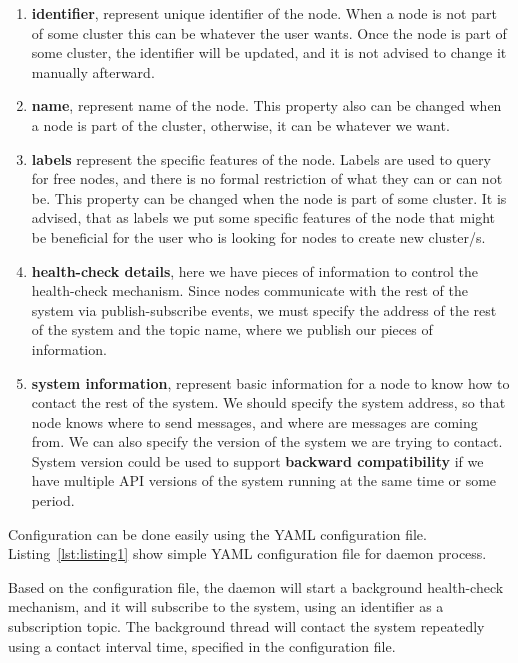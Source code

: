 \begin{enumerate}[start=1,label={(\bfseries \arabic*)}] \label{imp:features}
	\item \textbf{identifier}, represent unique identifier of the node. When a node is not part of some cluster this can be whatever the user wants. Once the node is part of some cluster, the identifier will be updated, and it is not advised to change it manually afterward.
	\item \textbf{name}, represent name of the node. This property also can be changed when a node is part of the cluster, otherwise, it can be whatever we want.
	\item \textbf{labels} represent the specific features of the node. Labels are used to query for free nodes, and there is no formal restriction of what they can or can not be. This property can be changed when the node is part of some cluster. It is advised, that as labels we put some specific features of the node that might be beneficial for the user who is looking for nodes to create new cluster/s.
	\item \textbf{health-check details}, here we have pieces of information to control the health-check mechanism. Since nodes communicate with the rest of the system via publish-subscribe events, we must specify the address of the rest of the system and the topic name, where we publish our pieces of information.
	\item \textbf{system information}, represent basic information for a node to know how to contact the rest of the system. We should specify the system address, so that node knows where to send messages, and where are messages are coming from. We can also specify the version of the system we are trying to contact. System version could be used to support \textbf{backward compatibility} if we have multiple API versions of the system running at the same time or some period.
\end{enumerate} 

\noindent
Configuration can be done easily using the YAML configuration file. Listing~\ref{lst:listing1} show simple YAML configuration file for daemon process.



\noindent
Based on the configuration file, the daemon will start a background health-check mechanism, and it will subscribe to the system, using an identifier as a subscription topic. The background thread will contact the system repeatedly using a contact interval time, specified in the configuration file. 

